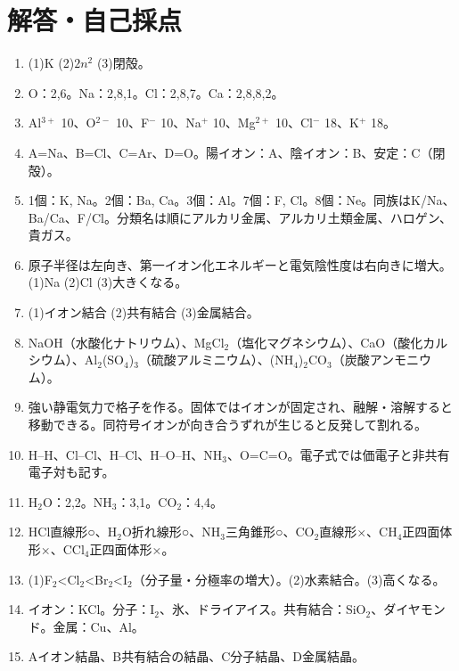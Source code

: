 \documentclass[11pt,a4paper]{ctexart}
\begin{document}
\section*{解答・自己採点}
\small
\begin{enumerate}[label=\textbf{問\arabic*.},leftmargin=14mm]
\item (1)K (2)$2n^2$ (3)閉殻。
\item O：2,6。Na：2,8,1。Cl：2,8,7。Ca：2,8,8,2。
\item Al$^{3+}$ 10、O$^{2-}$ 10、F$^-$ 10、Na$^+$ 10、Mg$^{2+}$ 10、Cl$^-$ 18、K$^+$ 18。
\item A=Na、B=Cl、C=Ar、D=O。陽イオン：A、陰イオン：B、安定：C（閉殻）。
\item 1個：K, Na。2個：Ba, Ca。3個：Al。7個：F, Cl。8個：Ne。同族はK/Na、Ba/Ca、F/Cl。分類名は順にアルカリ金属、アルカリ土類金属、ハロゲン、貴ガス。
\item 原子半径は左向き、第一イオン化エネルギーと電気陰性度は右向きに増大。(1)Na (2)Cl (3)大きくなる。
\item (1)イオン結合 (2)共有結合 (3)金属結合。
\item NaOH（水酸化ナトリウム）、MgCl$_2$（塩化マグネシウム）、CaO（酸化カルシウム）、Al$_2$(SO$_4$)$_3$（硫酸アルミニウム）、(NH$_4$)$_2$CO$_3$（炭酸アンモニウム）。
\item 強い静電気力で格子を作る。固体ではイオンが固定され、融解・溶解すると移動できる。同符号イオンが向き合うずれが生じると反発して割れる。
\item H--H、Cl--Cl、H--Cl、H--O--H、NH$_3$、O=C=O。電子式では価電子と非共有電子対も記す。
\item H$_2$O：2,2。NH$_3$：3,1。CO$_2$：4,4。
\item HCl直線形○、H$_2$O折れ線形○、NH$_3$三角錐形○、CO$_2$直線形×、CH$_4$正四面体形×、CCl$_4$正四面体形×。
\item (1)F$_2$<Cl$_2$<Br$_2$<I$_2$（分子量・分極率の増大）。(2)水素結合。(3)高くなる。
\item イオン：KCl。分子：I$_2$、氷、ドライアイス。共有結合：SiO$_2$、ダイヤモンド。金属：Cu、Al。
\item Aイオン結晶、B共有結合の結晶、C分子結晶、D金属結晶。
\end{enumerate}
\fi
\end{document}
